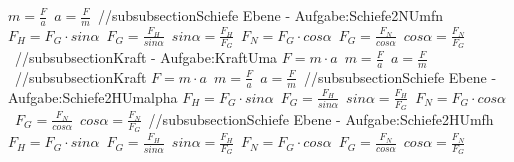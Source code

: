 $ m = \frac{F}{a} $\ 
$ a = \frac{F}{m} $\ 
//subsubsection{Schiefe Ebene - Aufgabe:Schiefe2NUmfn} 
$ F_{H}  = F_{G} \cdot sin \alpha $\ 
$ F_{G}  = \frac{ F_{H} }{sin \alpha } $\ 
$ sin \alpha  = \frac{F_{H} }{F_{G} } $\ 
$ F_{N}  = F_{G} \cdot cos \alpha $\ 
$ F_{G}  = \frac{ F_{N} }{cos \alpha } $\ 
$ cos \alpha  = \frac{F_{N} }{F_{G} } $\ 
//subsubsection{Kraft - Aufgabe:KraftUma} 
$ F = m\cdot a $\ 
$ m = \frac{F}{a} $\ 
$ a = \frac{F}{m} $\ 
//subsubsection{Kraft} 
$ F = m\cdot a $\ 
$ m = \frac{F}{a} $\ 
$ a = \frac{F}{m} $\ 
//subsubsection{Schiefe Ebene - Aufgabe:Schiefe2HUmalpha} 
$ F_{H}  = F_{G} \cdot sin \alpha $\ 
$ F_{G}  = \frac{ F_{H} }{sin \alpha } $\ 
$ sin \alpha  = \frac{F_{H} }{F_{G} } $\ 
$ F_{N}  = F_{G} \cdot cos \alpha $\ 
$ F_{G}  = \frac{ F_{N} }{cos \alpha } $\ 
$ cos \alpha  = \frac{F_{N} }{F_{G} } $\ 
//subsubsection{Schiefe Ebene - Aufgabe:Schiefe2HUmfh} 
$ F_{H}  = F_{G} \cdot sin \alpha $\ 
$ F_{G}  = \frac{ F_{H} }{sin \alpha } $\ 
$ sin \alpha  = \frac{F_{H} }{F_{G} } $\ 
$ F_{N}  = F_{G} \cdot cos \alpha $\ 
$ F_{G}  = \frac{ F_{N} }{cos \alpha } $\ 
$ cos \alpha  = \frac{F_{N} }{F_{G} } $\ 
